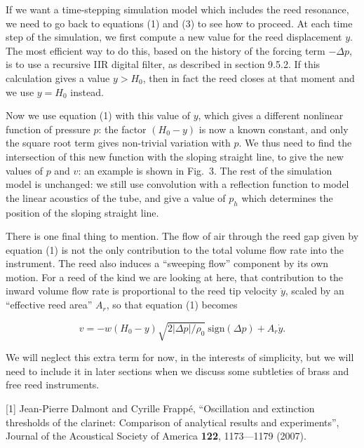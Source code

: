   If we want a time-stepping simulation model which includes the reed 
  resonance, we need to go back to equations (1) and (3) to see how to proceed. 
  At each time step of the simulation, we first compute a new value for the 
  reed displacement $y$. The most efficient way to do this, based on the 
  history of the forcing term $-\Delta p$, is to use a recursive IIR digital 
  filter, as described in section 9.5.2. If this calculation gives a value $y > 
  H_0$, then in fact the reed closes at that moment and we use $y=H_0$ instead. 

  Now we use equation (1) with this value of $y$, which gives a different 
  nonlinear function of pressure $p$: the factor $(H_0-y)$ is now a known 
  constant, and only the square root term gives non-trivial variation with $p$. 
  We thus need to find the intersection of this new function with the sloping 
  straight line, to give the new values of $p$ and $v$: an example is shown in 
  Fig.\ 3. The rest of the simulation model is unchanged: we still use 
  convolution with a reflection function to model the linear acoustics of the 
  tube, and give a value of $p_h$ which determines the position of the sloping 
  straight line. 

  There is one final thing to mention. The flow of air through the reed gap 
  given by equation (1) is not the only contribution to the total volume flow 
  rate into the instrument. The reed also induces a ``sweeping flow'' component 
  by its own motion. For a reed of the kind we are looking at here, that 
  contribution to the inward volume flow rate is proportional to the reed tip 
  velocity $\dot{y}$, scaled by an ``effective reed area'' $A_r$, so that 
  equation (1) becomes 

  $$v=-w(H_0-y) \sqrt{2 |\Delta p|/\rho_0} \mathrm{~sign} (\Delta p)+A_r 
  \dot{y} . \tag{14}$$ 

  We will neglect this extra term for now, in the interests of simplicity, but 
  we will need to include it in later sections when we discuss some subtleties 
  of brass and free reed instruments. 

  \sectionreferences{}[1] Jean-Pierre Dalmont and Cyrille Frappé, “Oscillation 
  and extinction thresholds of the clarinet: Comparison of analytical results 
  and experiments”, Journal of the Acoustical Society of America \textbf{122}, 
  1173—1179 (2007). 